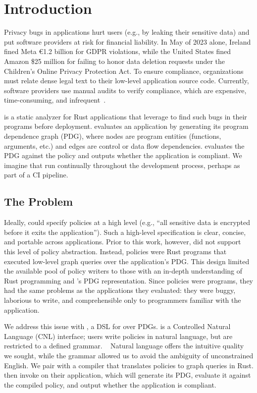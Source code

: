 \chapter{Introduction}
\label{sec:intro}

Privacy bugs in applications hurt users (e.g., by leaking their sensitive data) and put software providers 
at risk for financial liability.
%
In May of 2023 alone, Ireland fined Meta €1.2 billion for GDPR violations, 
while the United States fined Amazon \$25 million for failing to honor data deletion requests 
under the Children’s Online Privacy Protection Act\cite{meta-fine,amazon-fine}.
%
To ensure compliance, organizations must relate dense legal text to their low-level application source code.
%
Currently, software providers use manual audits to verify compliance, which are expensive, time-consuming,
and infrequent~\cite{CostContinuousCompliance2020,smithGDPRRacketWho}.

\sys{} is a static analyzer for Rust applications that \devs{} leverage to find such bugs in their programs before deployment.
%
\sys{} evaluates an application by generating its program dependence graph (PDG), 
where nodes are program entities (functions, arguments, etc.) and edges are control or data flow dependencies.
%
\sys{} evaluates the PDG against the policy and outputs whether the application is compliant.
%
We imagine that \devs{} run \sys{} continually throughout the development process, perhaps as part of a CI pipeline.

\section{The Problem}
Ideally, \writers{} could specify policies at a high level (e.g., ``all sensitive data is encrypted before it exits the application'').
%
Such a high-level specification is clear, concise, and portable across applications.
%
Prior to this work, however, \sys{} did not support this level of policy abstraction.
%
Instead, policies were Rust programs that executed low-level graph queries over the application's PDG.
%
This design limited the available pool of policy writers to those with an in-depth understanding of Rust programming and \sys{}'s PDG representation.
%
Since policies were programs, they had the same problems as the applications they evaluated: 
they were buggy, laborious to write, and comprehensible only to programmers familiar with the application.
%

We address this issue with \syslang{}, a DSL for \policies{} over PDGs.
%
\syslang{} is a Controlled Natural Language (CNL) interface; users write policies in natural language, but are restricted to a defined grammar. ~\cite{cnl-def}
%
Natural language offers the intuitive quality we sought, while the grammar allowed us to avoid the ambiguity of unconstrained English.
%
We pair \syslang{} with a compiler that translates policies to \sys{} graph queries in Rust.
%
\Devs{} then invoke \sys{} on their application,
which will generate its PDG, evaluate it against the compiled \syslang{} policy,
and output whether the application is compliant.
%

